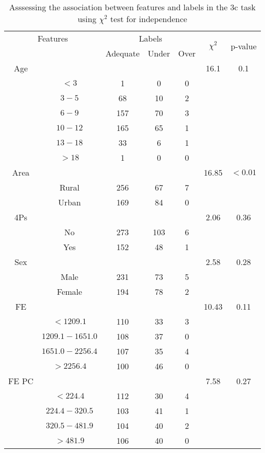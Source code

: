 \begin{table}[!htb]
\centering
\caption{Asssessing the association between features and labels in the 3c task using $\chi^2$ test for independence}
\label{tab:chitest_3c}
\begin{tabular}{c c | c c c| c | c}
\hline
\multicolumn{2}{c|}{Features}& \multicolumn{3}{c|}{Labels}& \multirow{2}{*}{$\chi^2$} & \multirow{2}{*}{p-value}\\ 
& & Adequate & Under & Over & & \\ 
\hline
Age &  &  &  & & 16.1 & 0.1 \\ 
& $< 3$ & 1 & 0 & 0& & \\ 
& $3-5$ & 68 & 10 & 2& & \\ 
& $6-9$ & 157 & 70 & 3& & \\ 
& $10-12$ & 165 & 65 & 1& & \\ 
& $13-18$ & 33 & 6 & 1& & \\ 
& $> 18$ & 1 & 0 & 0& & \\ 
\hline 
Area &  &  &  & & 16.85 & $< 0.01$ \\ 
& Rural & 256 & 67 & 7& & \\ 
& Urban & 169 & 84 & 0& & \\ 
\hline 
4Ps &  &  &  & & 2.06 & 0.36 \\ 
& No & 273 & 103 & 6& & \\ 
& Yes & 152 & 48 & 1& & \\ 
\hline 
Sex &  &  &  & & 2.58 & 0.28 \\ 
& Male & 231 & 73 & 5& & \\ 
& Female & 194 & 78 & 2& & \\ 
\hline 
FE &  &  &  & & 10.43 & 0.11 \\ 
& $< 1209.1$ & 110 & 33 & 3& & \\ 
& $1209.1-1651.0$ & 108 & 37 & 0& & \\ 
& $1651.0-2256.4$ & 107 & 35 & 4& & \\ 
& $> 2256.4$ & 100 & 46 & 0& & \\ 
\hline 
FE PC &  &  &  & & 7.58 & 0.27 \\ 
& $< 224.4$ & 112 & 30 & 4& & \\ 
& $224.4-320.5$ & 103 & 41 & 1& & \\ 
& $320.5-481.9$ & 104 & 40 & 2& & \\ 
& $> 481.9$ & 106 & 40 & 0& & \\ 
\hline 
\end{tabular}
\end{table}
